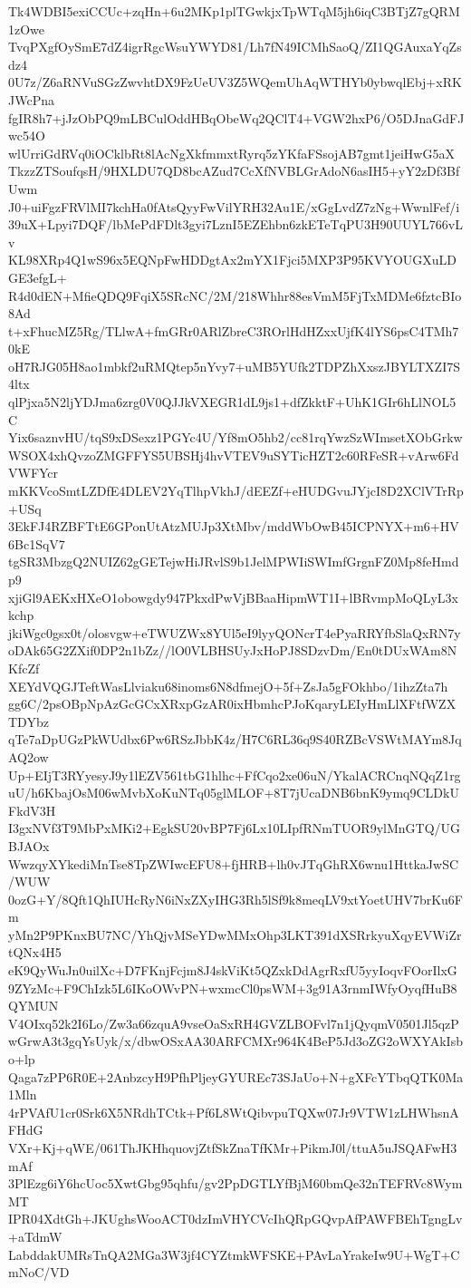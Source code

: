 Tk4WDBI5exiCCUc+zqHn+6u2MKp1plTGwkjxTpWTqM5jh6iqC3BTjZ7gQRM1zOwe
TvqPXgfOySmE7dZ4igrRgcWsuYWYD81/Lh7fN49ICMhSaoQ/ZI1QGAuxaYqZsdz4
0U7z/Z6aRNVuSGzZwvhtDX9FzUeUV3Z5WQemUhAqWTHYb0ybwqlEbj+xRKJWcPna
fgIR8h7+jJzObPQ9mLBCulOddHBqObeWq2QClT4+VGW2hxP6/O5DJnaGdFJwc54O
wlUrriGdRVq0iOCklbRt8lAcNgXkfmmxtRyrq5zYKfaFSsojAB7gmt1jeiHwG5aX
TkzzZTSoufqsH/9HXLDU7QD8bcAZud7CcXfNVBLGrAdoN6asIH5+yY2zDf3BfUwm
J0+uiFgzFRVlMI7kchHa0fAtsQyyFwVilYRH32Au1E/xGgLvdZ7zNg+WwnlFef/i
39uX+Lpyi7DQF/lbMePdFDlt3gyi7LznI5EZEhbn6zkETeTqPU3H90UUYL766vLv
KL98XRp4Q1wS96x5EQNpFwHDDgtAx2mYX1Fjci5MXP3P95KVYOUGXuLDGE3efgL+
R4d0dEN+MfieQDQ9FqiX5SRcNC/2M/218Whhr88esVmM5FjTxMDMe6fztcBIo8Ad
t+xFhucMZ5Rg/TLlwA+fmGRr0ARlZbreC3ROrlHdHZxxUjfK4lYS6psC4TMh70kE
oH7RJG05H8ao1mbkf2uRMQtep5nYvy7+uMB5YUfk2TDPZhXxszJBYLTXZI7S4ltx
qlPjxa5N2ljYDJma6zrg0V0QJJkVXEGR1dL9js1+dfZkktF+UhK1GIr6hLlNOL5C
Yix6saznvHU/tqS9xDSexz1PGYc4U/Yf8mO5hb2/cc81rqYwzSzWImsetXObGrkw
WSOX4xhQvzoZMGFFYS5UBSHj4hvVTEV9uSYTicHZT2c60RFeSR+vArw6FdVWFYcr
mKKVcoSmtLZDfE4DLEV2YqTlhpVkhJ/dEEZf+eHUDGvuJYjcI8D2XClVTrRp+USq
3EkFJ4RZBFTtE6GPonUtAtzMUJp3XtMbv/mddWbOwB45ICPNYX+m6+HV6Bc1SqV7
tgSR3MbzgQ2NUIZ62gGETejwHiJRvlS9b1JelMPWIiSWImfGrgnFZ0Mp8feHmdp9
xjiGl9AEKxHXeO1obowgdy947PkxdPwVjBBaaHipmWT1I+lBRvmpMoQLyL3xkchp
jkiWgc0gsx0t/olosvgw+eTWUZWx8YUl5eI9lyyQONcrT4ePyaRRYfbSlaQxRN7y
oDAk65G2ZXif0DP2n1bZz//lO0VLBHSUyJxHoPJ8SDzvDm/En0tDUxWAm8NKfcZf
XEYdVQGJTeftWasLlviaku68inoms6N8dfmejO+5f+ZsJa5gFOkhbo/1ihzZta7h
gg6C/2psOBpNpAzGcGCxXRxpGzAR0ixHbmhcPJoKqaryLEIyHmLlXFtfWZXTDYbz
qTe7aDpUGzPkWUdbx6Pw6RSzJbbK4z/H7C6RL36q9S40RZBcVSWtMAYm8JqAQ2ow
Up+EIjT3RYyesyJ9y1lEZV561tbG1hlhc+FfCqo2xe06uN/YkalACRCnqNQqZ1rg
uU/h6KbajOsM06wMvbXoKuNTq05glMLOF+8T7jUcaDNB6bnK9ymq9CLDkUFkdV3H
I3gxNVf3T9MbPxMKi2+EgkSU20vBP7Fj6Lx10LIpfRNmTUOR9ylMnGTQ/UGBJAOx
WwzqyXYkediMnTse8TpZWIwcEFU8+fjHRB+lh0vJTqGhRX6wnu1HttkaJwSC/WUW
0ozG+Y/8Qft1QhIUHcRyN6iNxZXyIHG3Rh5lSf9k8meqLV9xtYoetUHV7brKu6Fm
yMn2P9PKnxBU7NC/YhQjvMSeYDwMMxOhp3LKT391dXSRrkyuXqyEVWiZrtQNx4H5
eK9QyWuJn0uilXc+D7FKnjFcjm8J4skViKt5QZxkDdAgrRxfU5yyIoqvFOorIlxG
9ZYzMc+F9ChIzk5L6IKoOWvPN+wxmcCl0psWM+3g91A3rnmIWfyOyqfHuB8QYMUN
V4OIxq52k2I6Lo/Zw3a66zquA9vseOaSxRH4GVZLBOFvl7n1jQyqmV0501Jl5qzP
wGrwA3t3gqYsUyk/x/dbwOSxAA30ARFCMXr964K4BeP5Jd3oZG2oWXYAkIsbo+lp
Qaga7zPP6R0E+2AnbzcyH9PfhPljeyGYUREc73SJaUo+N+gXFcYTbqQTK0Ma1Mln
4rPVAfU1cr0Srk6X5NRdhTCtk+Pf6L8WtQibvpuTQXw07Jr9VTW1zLHWhsnAFHdG
VXr+Kj+qWE/061ThJKHhquovjZtfSkZnaTfKMr+PikmJ0l/ttuA5uJSQAFwH3mAf
3PlEzg6iY6hcUoc5XwtGbg95qhfu/gv2PpDGTLYfBjM60bmQe32nTEFRVc8WymMT
IPR04XdtGh+JKUghsWooACT0dzImVHYCVcIhQRpGQvpAfPAWFBEhTgngLv+aTdmW
LabddakUMRsTnQA2MGa3W3jf4CYZtmkWFSKE+PAvLaYrakeIw9U+WgT+CmNoC/VD
